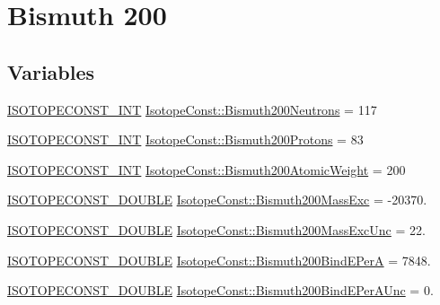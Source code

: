 \hypertarget{group___isotope_const-_bismuth-_bi200}{}\section{Bismuth 200}
\label{group___isotope_const-_bismuth-_bi200}
\subsection*{Variables}
\begin{DoxyCompactItemize}
\item 
\mbox{\hyperlink{group___isotope_const-_macros_ga5f18360b3e99483a35c32d789e62621c}{I\+S\+O\+T\+O\+P\+E\+C\+O\+N\+S\+T\+\_\+\+I\+NT}} \mbox{\hyperlink{group___isotope_const-_bismuth-_bi200_gae8e66937f2295cf0d06ecc818ecbe0a1}{Isotope\+Const\+::\+Bismuth200\+Neutrons}} = 117
\item 
\mbox{\hyperlink{group___isotope_const-_macros_ga5f18360b3e99483a35c32d789e62621c}{I\+S\+O\+T\+O\+P\+E\+C\+O\+N\+S\+T\+\_\+\+I\+NT}} \mbox{\hyperlink{group___isotope_const-_bismuth-_bi200_gacf3e337026225cecf11e77de58855d12}{Isotope\+Const\+::\+Bismuth200\+Protons}} = 83
\item 
\mbox{\hyperlink{group___isotope_const-_macros_ga5f18360b3e99483a35c32d789e62621c}{I\+S\+O\+T\+O\+P\+E\+C\+O\+N\+S\+T\+\_\+\+I\+NT}} \mbox{\hyperlink{group___isotope_const-_bismuth-_bi200_gae7385dbd17a4c34d5f43d4f9b5c7e227}{Isotope\+Const\+::\+Bismuth200\+Atomic\+Weight}} = 200
\item 
\mbox{\hyperlink{group___isotope_const-_macros_ga8f45a7272ce02c0b4c65c44636ed719a}{I\+S\+O\+T\+O\+P\+E\+C\+O\+N\+S\+T\+\_\+\+D\+O\+U\+B\+LE}} \mbox{\hyperlink{group___isotope_const-_bismuth-_bi200_ga6dbb37f0f8842ba6bbe87385c4627d89}{Isotope\+Const\+::\+Bismuth200\+Mass\+Exc}} = -\/20370.
\item 
\mbox{\hyperlink{group___isotope_const-_macros_ga8f45a7272ce02c0b4c65c44636ed719a}{I\+S\+O\+T\+O\+P\+E\+C\+O\+N\+S\+T\+\_\+\+D\+O\+U\+B\+LE}} \mbox{\hyperlink{group___isotope_const-_bismuth-_bi200_ga58df9d36f4e3edc5234d128e56e590c0}{Isotope\+Const\+::\+Bismuth200\+Mass\+Exc\+Unc}} = 22.
\item 
\mbox{\hyperlink{group___isotope_const-_macros_ga8f45a7272ce02c0b4c65c44636ed719a}{I\+S\+O\+T\+O\+P\+E\+C\+O\+N\+S\+T\+\_\+\+D\+O\+U\+B\+LE}} \mbox{\hyperlink{group___isotope_const-_bismuth-_bi200_ga68750fccd3d4f5507af4519bb4ab6760}{Isotope\+Const\+::\+Bismuth200\+Bind\+E\+PerA}} = 7848.
\item 
\mbox{\hyperlink{group___isotope_const-_macros_ga8f45a7272ce02c0b4c65c44636ed719a}{I\+S\+O\+T\+O\+P\+E\+C\+O\+N\+S\+T\+\_\+\+D\+O\+U\+B\+LE}} \mbox{\hyperlink{group___isotope_const-_bismuth-_bi200_gaabe78862466557b05cd7d745cddb7a7d}{Isotope\+Const\+::\+Bismuth200\+Bind\+E\+Per\+A\+Unc}} = 0.

\end{DoxyCompactItemize}
